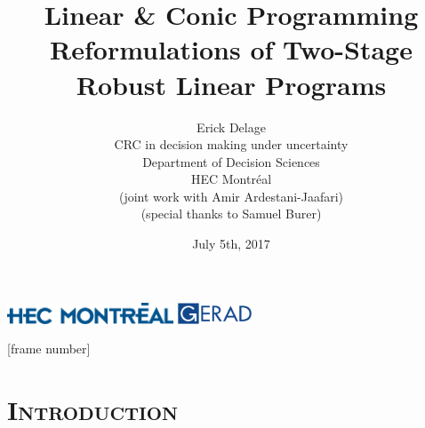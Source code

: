 \documentclass[xcolor=x11names,compress]{beamer}
\renewcommand{\(}{\begin{columns}}
\renewcommand{\)}{\end{columns}}
\newcommand{\<}[1]{\begin{column}{#1}}
\renewcommand{\>}{\end{column}}
\newcommand{\0}{\V{0}}
\newcommand{\1}{\V{1}}
\begin{document}
\begin{frame}

\centering
\title{Linear \& Conic Programming Reformulations of Two-Stage Robust Linear Programs}
\subtitle{}
\author{
Erick Delage\\
CRC in decision making under uncertainty\\
Department of Decision Sciences\\
HEC Montr\'{e}al\\
\vspace{0.5 cm}
	{\small (joint work with Amir Ardestani-Jaafari)\\(special thanks to Samuel Burer)}\\
}
\date{
	July 5th, 2017
}
\titlepage
 \includegraphics[height=0.25in]{HEC_Montreal_541.eps}\hspace{0.3\textwidth} \includegraphics[height=0.25in]{gerad-vector-logo2.png}
\end{frame}
[frame number]



\section[Introduction]{\scshape Introduction}
\subsection[ ]{\scshape  }
\end{document}
